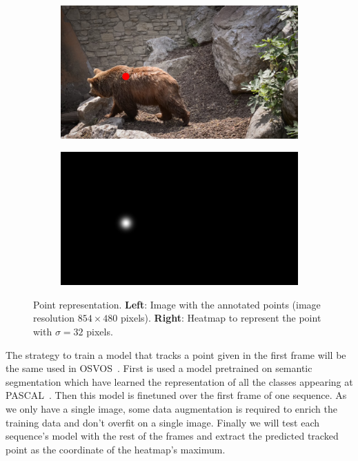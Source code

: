 \begin{figure}[h]
  \centering
  \begin{subfigure}{.5\textwidth}
    \centering
    \includegraphics[width=.8\linewidth]{figures/methods/heatmaps/image_point.png}
  \end{subfigure}%
  \begin{subfigure}{.5\textwidth}
    \centering
    \includegraphics[width=.8\linewidth]{figures/methods/heatmaps/heatmap.png}
  \end{subfigure}
  \caption{
  Point representation.
  \textbf{Left}: Image with the annotated points (image resolution $854 \times 480$ pixels).
  \textbf{Right}: Heatmap to represent the point with $\sigma = 32$ pixels. }
  \label{fig:point_representation}
\end{figure}

The strategy to train a model that tracks a point given in the first frame will be the same used in OSVOS~\osvos.
First is used a model pretrained on semantic segmentation which have learned the representation of all the classes appearing at PASCAL~\pascal.
Then this model is finetuned over the first frame of one sequence.
As we only have a single image, some data augmentation is required to enrich the training data and don't overfit on a single image.
Finally we will test each sequence's model with the rest of the frames and extract the predicted tracked point as the coordinate of the heatmap's maximum.

